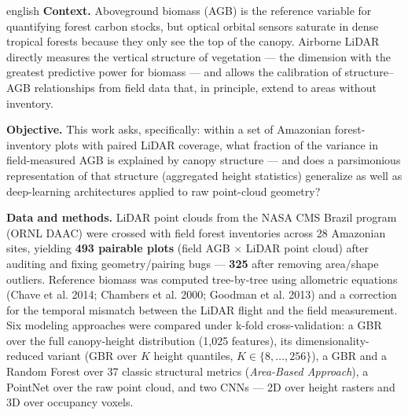 \documentclass[article,12pt,oneside,a4paper]{abntex2}
\begin{document}
\begin{resumoumacoluna}[Abstract]
\begin{otherlanguage*}{english}
\noindent
\textbf{Context.} Aboveground biomass (AGB) is the reference variable for
quantifying forest carbon stocks, but optical orbital sensors saturate in
dense tropical forests because they only see the top of the canopy. Airborne
LiDAR directly measures the vertical structure of vegetation --- the
dimension with the greatest predictive power for biomass --- and allows the
calibration of structure--AGB relationships from field data that, in
principle, extend to areas without inventory.

\textbf{Objective.} This work asks, specifically: within a set of Amazonian
forest-inventory plots with paired LiDAR coverage, what fraction of the
variance in field-measured AGB is explained by canopy structure --- and does a
parsimonious representation of that structure (aggregated height statistics)
generalize as well as deep-learning architectures applied to raw point-cloud
geometry?

\textbf{Data and methods.} LiDAR point clouds from the NASA CMS Brazil program
(ORNL DAAC) were crossed with field forest inventories across 28 Amazonian
sites, yielding \textbf{493 pairable plots} (field AGB $\times$ LiDAR point
cloud) after auditing and fixing geometry/pairing bugs --- \textbf{325} after
removing area/shape outliers. Reference biomass was computed tree-by-tree
using allometric equations (Chave et al. 2014; Chambers et al. 2000; Goodman
et al. 2013) and a correction for the temporal mismatch between the LiDAR
flight and the field measurement. Six modeling approaches were compared under
k-fold cross-validation: a GBR over the full canopy-height distribution (1,025
features), its dimensionality-reduced variant (GBR over $K$ height quantiles,
$K \in \{8,\dots,256\}$), a GBR and a Random Forest over 37 classic structural
metrics (\textit{Area-Based Approach}), a PointNet over the raw point cloud,
and two CNNs --- 2D over height rasters and 3D over occupancy voxels.


\end{otherlanguage*}
\end{resumoumacoluna}
\end{document}
